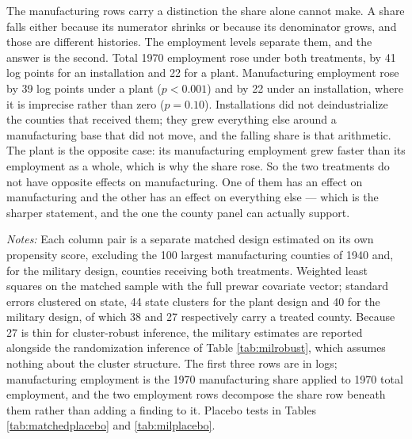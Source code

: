 \documentclass[12pt]{article}
\newcommand{\fittab}[1]{%
  \sbox{\tabbox}{#1}%
  \ifdim\wd\tabbox>\textwidth
    \resizebox{\textwidth}{!}{\usebox{\tabbox}}%
  \else\usebox{\tabbox}\fi}
\begin{document}
The manufacturing rows carry a distinction the share alone cannot make. A share
falls either because its numerator shrinks or because its denominator grows, and
those are different histories. The employment levels separate them, and the
answer is the second. Total 1970 employment rose under both treatments, by 41 log
points for an installation and 22 for a plant. Manufacturing employment rose by
39 log points under a plant ($p < 0.001$) and by 22 under an installation, where
it is imprecise rather than zero ($p = 0.10$). Installations did not
deindustrialize the counties that received them; they grew everything else around
a manufacturing base that did not move, and the falling share is that arithmetic.
The plant is the opposite case: its manufacturing employment grew faster than its
employment as a whole, which is why the share rose. So the two treatments do not
have opposite effects on manufacturing. One of them has an effect on
manufacturing and the other has an effect on everything else --- which is the
sharper statement, and the one the county panel can actually support.

\begin{table}[htbp]
\centering
\caption{Two forms of federal capital, matched designs}
\label{tab:twotreatments}
\fittab{}
\vspace{2pt}
\begin{minipage}{\textwidth}\footnotesize
\textit{Notes:} Each column pair is a separate matched design estimated on its own propensity
score, excluding the 100 largest manufacturing counties of 1940 and, for the
military design, counties receiving both treatments. Weighted least squares on
the matched sample with the full prewar covariate vector; standard errors
clustered on state, 44 state clusters for the plant design and 40 for the
military design, of which 38 and 27 respectively carry a treated county. Because
27 is thin for cluster-robust inference, the military estimates are reported
alongside the randomization inference of Table \ref{tab:milrobust}, which
assumes nothing about the cluster structure. The first three rows are in logs; manufacturing employment
is the 1970 manufacturing share applied to 1970 total employment, and the two
employment rows decompose the share row beneath them rather than adding a
finding to it. Placebo tests in Tables \ref{tab:matchedplacebo} and
\ref{tab:milplacebo}.
\end{minipage}
\end{table}
\end{document}
